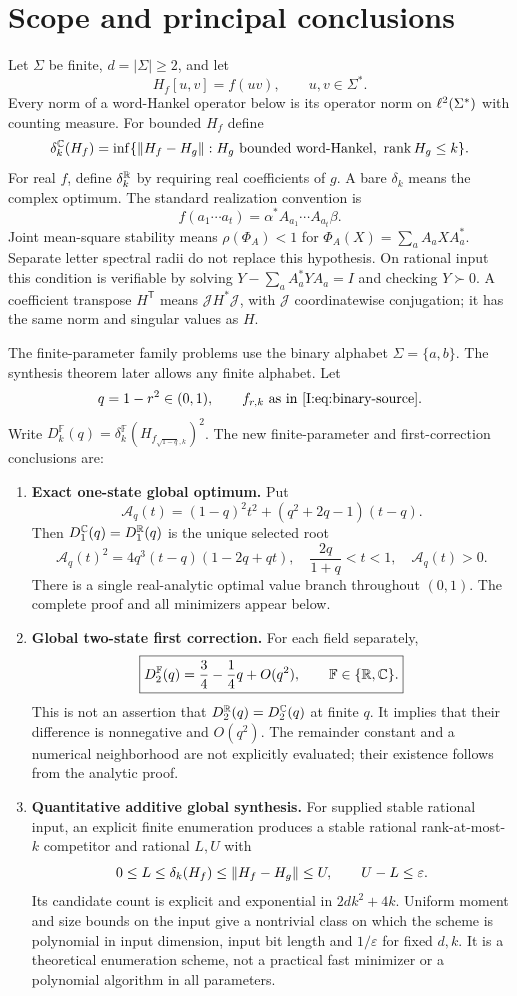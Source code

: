 \section{Scope and principal conclusions}
Let $\Sigma$ be finite, $d=|\Sigma|\ge2$, and let
\[
H_f[u,v]=f(uv),\qquad u,v\in\Sigma^*.
\]
Every norm of a word-Hankel operator below is its operator norm on $\ell^2(\Sigma^*)$ with counting measure. For bounded $H_f$ define
\[
\delta_k^{\mathbb C}(H_f)=\inf\{\left\lVert H_f-H_g\right\rVert:H_g\text{ bounded word-Hankel},\ \operatorname{rank} H_g\le k\}.
\]
For real $f$, define $\delta_k^{\mathbb R}$ by requiring real coefficients of $g$. A bare $\delta_k$ means the complex optimum. The standard realization convention is
\[
f(a_1\cdots a_t)=\alpha^*A_{a_1}\cdots A_{a_t}\beta.
\]
Joint mean-square stability means $\rho(\Phi_A)<1$ for $\Phi_A(X)=\sum_a A_aXA_a^*$. Separate letter spectral radii do not replace this hypothesis. On rational input this condition is verifiable by solving $Y-\sum_aA_a^*YA_a=I$ and checking $Y\succ0$. A coefficient transpose $H^{\mathsf T}$ means $\mathcal JH^*\mathcal J$, with $\mathcal J$ coordinatewise conjugation; it has the same norm and singular values as $H$.

The finite-parameter family problems use the binary alphabet $\Sigma=\{a,b\}$. The synthesis theorem later allows any finite alphabet. Let
\[
q=1-r^2\in(0,1),\qquad f_{r,k}\text{ as in \eqref{I:eq:binary-source}}.
\]
Write $D_k^{\mathbb F}(q)=\delta_k^{\mathbb F}(H_{f_{\sqrt{1-q},k}})^2$.
The new finite-parameter and first-correction conclusions are:
\begin{enumerate}[leftmargin=*]
\item \textbf{Exact one-state global optimum.} Put
\[
\mathcal A_q(t)=(1-q)^2t^2+(q^2+2q-1)(t-q).
\]
Then $D_1^{\mathbb C}(q)=D_1^{\mathbb R}(q)$ is the unique selected root
\[
\boxed{\mathcal A_q(t)^2=4q^3(t-q)(1-2q+qt),\quad
\frac{2q}{1+q}<t<1,\quad\mathcal A_q(t)>0.}
\]
There is a single real-analytic optimal value branch throughout $(0,1)$. The complete proof and all minimizers appear below.
\item \textbf{Global two-state first correction.} For each field separately,
\[
\boxed{D_2^{\mathbb F}(q)=\frac34-\frac14q+O(q^2),
\qquad \mathbb F\in\{\mathbb R,\mathbb C\}.}
\]
This is not an assertion that $D_2^{\mathbb R}(q)=D_2^{\mathbb C}(q)$ at finite $q$. It implies that their difference is nonnegative and $O(q^2)$. The remainder constant and a numerical neighborhood are not explicitly evaluated; their existence follows from the analytic proof.
\item \textbf{Quantitative additive global synthesis.} For supplied stable rational input, an explicit finite enumeration produces a stable rational rank-at-most-$k$ competitor and rational $L,U$ with
\[
0\le L\le\delta_k(H_f)\le\left\lVert H_f-H_g\right\rVert\le U,\qquad U-L\le\varepsilon.
\]
Its candidate count is explicit and exponential in $2dk^2+4k$. Uniform moment and size bounds on the input give a nontrivial class on which the scheme is polynomial in input dimension, input bit length and $1/\varepsilon$ for fixed $d,k$. It is a theoretical enumeration scheme, not a practical fast minimizer or a polynomial algorithm in all parameters.
\end{enumerate}

